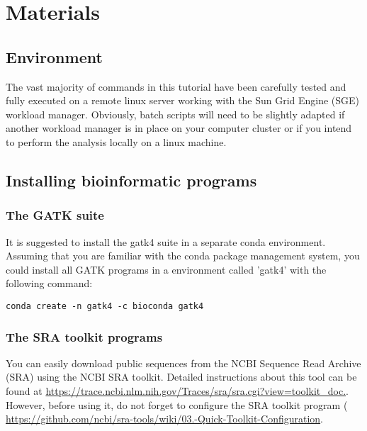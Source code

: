 \section{Materials}

\subsection{Environment}


The vast majority of commands in this tutorial have been carefully tested and fully executed on a remote linux server working with the Sun Grid Engine (SGE) workload manager. Obviously, batch scripts will need to be slightly adapted if another workload manager is in place on your computer cluster or if you intend to perform the analysis locally on a linux machine.





\subsection{Installing bioinformatic programs}

\subsubsection{The GATK suite}

It is suggested to install the gatk4 suite in a separate conda environment. Assuming that you are familiar with the conda package management system, you could install all GATK programs in a environment called 'gatk4' with the following command:

\begin{verbatim}
conda create -n gatk4 -c bioconda gatk4 
\end{verbatim}




\subsubsection{The SRA toolkit programs}

You can easily download public sequences from the NCBI Sequence Read Archive (SRA) using the NCBI SRA toolkit. Detailed instructions about this tool can be found at \href{https://trace.ncbi.nlm.nih.gov/Traces/sra/sra.cgi?view=toolkit_doc}{https://trace.ncbi.nlm.nih.gov/Traces/sra/sra.cgi?view=toolkit\_doc.}. However, before using it, do not forget to configure the SRA toolkit program ( \href{https://github.com/ncbi/sra-tools/wiki/03.-Quick-Toolkit-Configuration}{https://github.com/ncbi/sra-tools/wiki/03.-Quick-Toolkit-Configuration}.


